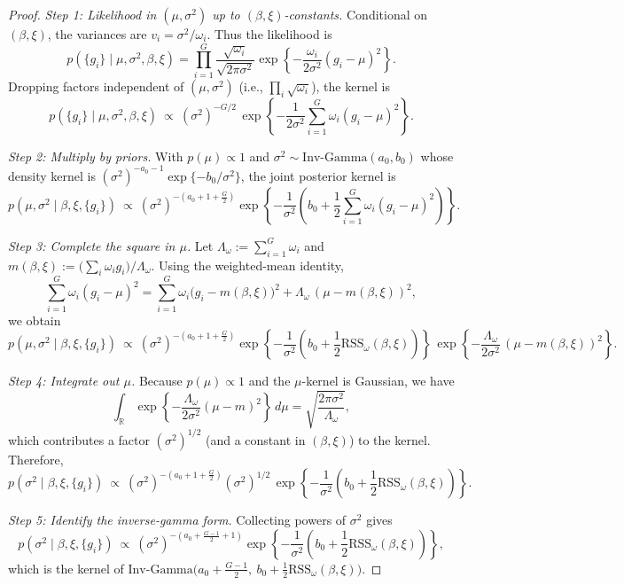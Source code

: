 \begin{proof}
\emph{Step 1: Likelihood in $(\mu,\sigma^2)$ up to $(\beta,\xi)$-constants.}
Conditional on $(\beta,\xi)$, the variances are $v_i=\sigma^2/\omega_i$.
Thus the likelihood is
\[
p(\{g_i\}\mid \mu,\sigma^2,\beta,\xi)
=\prod_{i=1}^G \frac{\sqrt{\omega_i}}{\sqrt{2\pi\sigma^2}}
\exp\!\left\{-\frac{\omega_i}{2\sigma^2}(g_i-\mu)^2\right\}.
\]
Dropping factors independent of $(\mu,\sigma^2)$ (i.e., $\prod_i \sqrt{\omega_i}$), the kernel is
\begin{equation}
p(\{g_i\}\mid \mu,\sigma^2,\beta,\xi)\ \propto\
(\sigma^2)^{-G/2}\,
\exp\!\left\{-\frac{1}{2\sigma^2}\sum_{i=1}^G \omega_i(g_i-\mu)^2\right\}.
\label{eq:lik-kernel}
\end{equation}

\emph{Step 2: Multiply by priors.}
With $p(\mu)\propto 1$ and $\sigma^2\sim\mathrm{Inv\text{-}Gamma}(a_0,b_0)$ whose density kernel is
$(\sigma^2)^{-a_0-1}\exp\{-b_0/\sigma^2\}$, the joint posterior kernel is
\[
p(\mu,\sigma^2\mid \beta,\xi,\{g_i\})
\ \propto\
(\sigma^2)^{-\left(a_0+1+\frac{G}{2}\right)}
\exp\!\left\{-\frac{1}{\sigma^2}\left(
b_0+\frac{1}{2}\sum_{i=1}^G \omega_i(g_i-\mu)^2
\right)\right\}.
\]

\emph{Step 3: Complete the square in $\mu$.}
Let $\Lambda_\omega:=\sum_{i=1}^G \omega_i$ and
$m(\beta,\xi):=\big(\sum_i \omega_i g_i\big)/\Lambda_\omega$.
Using the weighted-mean identity,
\[
\sum_{i=1}^G \omega_i(g_i-\mu)^2
=\sum_{i=1}^G \omega_i\big(g_i-m(\beta,\xi)\big)^2
+\Lambda_\omega\,(\mu-m(\beta,\xi))^2,
\]
we obtain
\[
p(\mu,\sigma^2\mid\beta,\xi,\{g_i\})
\ \propto\
(\sigma^2)^{-\left(a_0+1+\frac{G}{2}\right)}
\exp\!\left\{-\frac{1}{\sigma^2}\left(
b_0+\frac{1}{2}\mathrm{RSS}_\omega(\beta,\xi)
\right)\right\}\,
\exp\!\left\{-\frac{\Lambda_\omega}{2\sigma^2}\,(\mu-m(\beta,\xi))^2\right\}.
\]

\emph{Step 4: Integrate out $\mu$.}
Because $p(\mu)\propto 1$ and the $\mu$-kernel is Gaussian, we have
\[
\int_{\mathbb{R}}
\exp\!\left\{-\frac{\Lambda_\omega}{2\sigma^2}(\mu-m)^2\right\}\,d\mu
=\sqrt{\frac{2\pi\sigma^2}{\Lambda_\omega}},
\]
which contributes a factor $(\sigma^2)^{1/2}$ (and a constant in $(\beta,\xi)$) to the kernel.
Therefore,
\[
p(\sigma^2\mid \beta,\xi,\{g_i\})
\ \propto\
(\sigma^2)^{-\left(a_0+1+\frac{G}{2}\right)}(\sigma^2)^{1/2}\,
\exp\!\left\{-\frac{1}{\sigma^2}\left(
b_0+\frac{1}{2}\mathrm{RSS}_\omega(\beta,\xi)
\right)\right\}.
\]

\emph{Step 5: Identify the inverse-gamma form.}
Collecting powers of $\sigma^2$ gives
\[
p(\sigma^2\mid \beta,\xi,\{g_i\})
\ \propto\
(\sigma^2)^{-\left(a_0+\frac{G-1}{2}+1\right)}
\exp\!\left\{-\frac{1}{\sigma^2}\left(
b_0+\frac{1}{2}\mathrm{RSS}_\omega(\beta,\xi)
\right)\right\},
\]
which is the kernel of
\(
\mathrm{Inv\text{-}Gamma}\!\big(a_0+\tfrac{G-1}{2},\ b_0+\tfrac{1}{2}\mathrm{RSS}_\omega(\beta,\xi)\big).
\)
\end{proof}

